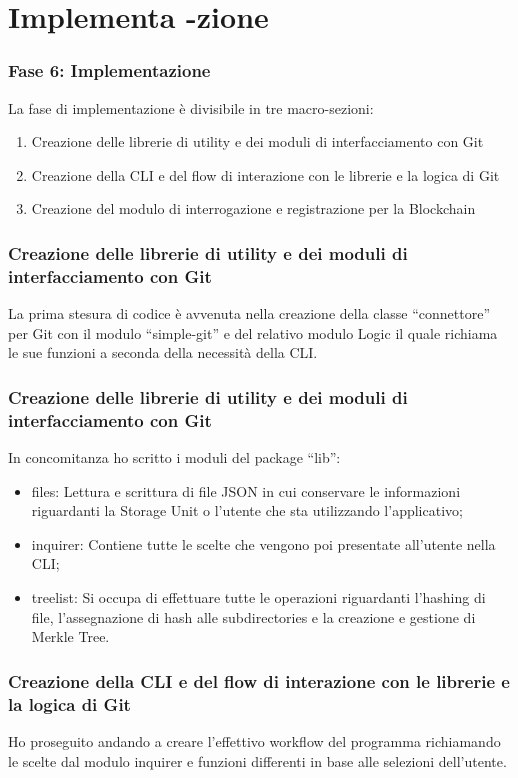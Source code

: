 \documentclass{beamer}
\begin{document}
\section{Implementa -zione}
\begin{frame}
	\frametitle{Fase 6: Implementazione}
	La fase di implementazione è divisibile in tre macro-sezioni:
	\begin{enumerate}
		\item Creazione delle librerie di utility e dei moduli di interfacciamento con Git
  		\item Creazione della CLI e del flow di interazione con le librerie e la logica di Git
  		\item Creazione del modulo di interrogazione e registrazione per la Blockchain
	\end{enumerate}
\end{frame}
\begin{frame}
	\frametitle{Creazione delle librerie di utility e dei moduli di interfacciamento con Git}
	La prima stesura di codice è avvenuta nella creazione della classe “connettore” per Git con il modulo “simple-git” e del relativo modulo Logic il quale richiama le sue funzioni a seconda della necessità della CLI.
\end{frame}
\begin{frame}
	\frametitle{Creazione delle librerie di utility e dei moduli di interfacciamento con Git}
	In concomitanza ho scritto i moduli del package “lib”:
	\begin{itemize}
		\item files: Lettura e scrittura di file JSON in cui conservare le informazioni riguardanti la Storage Unit o l’utente che sta utilizzando l’applicativo;
		\item inquirer: Contiene tutte le scelte che vengono poi presentate all’utente nella CLI;
		\item treelist: Si occupa di effettuare tutte le operazioni riguardanti l’hashing di file, l’assegnazione di hash alle subdirectories e la creazione e gestione di Merkle Tree.
	\end{itemize}
\end{frame}
\begin{frame}
	\frametitle{Creazione della CLI e del flow di interazione con le librerie e la logica di Git}
	Ho proseguito andando a creare l’effettivo workflow del programma richiamando le scelte dal modulo inquirer e funzioni differenti in base alle selezioni dell’utente.	
\end{frame}
\end{document}
